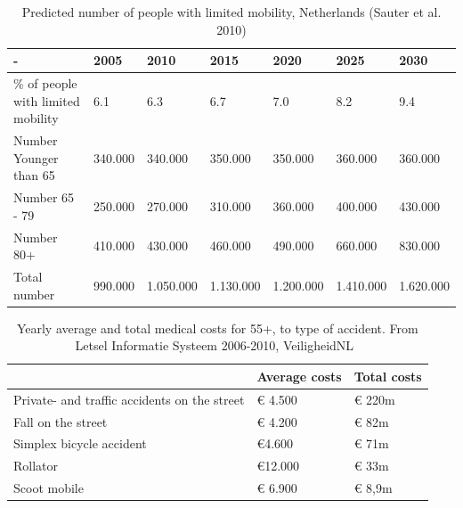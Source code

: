 \begin{table}[h]
	\caption[Predicted number of people with limited mobility]{Predicted number of people with limited mobility, Netherlands (Sauter et al. 2010)}
	\label{nrpeople}
	\centering
	\begin{tabular}{|p{63.6pt}|p{44pt}|p{44pt}|p{44pt}|p{44pt}|p{44pt}|p{44pt}|} 
		\hline 
		-& 2005 & 2010 & 2015 & 2020 & 2025 & 2030 \\
		\hline
		\% of people with limited \newline mobility & 6.1 & 6.3 & 6.7 & 7.0 & 8.2 & 9.4 \\ 
		Number Younger than 65 & 340.000 & 340.000 & 350.000 & 350.000 & 360.000 & 360.000 \\
		Number 65 - 79 & 250.000 & 270.000 & 310.000 & 360.000 & 400.000 & 430.000 \\
		Number 80+ & 410.000 & 430.000 & 460.000 & 490.000 & 660.000 & 830.000 \\
		\hline
		Total number & 990.000 & 1.050.000 & 1.130.000 & 1.200.000 & 1.410.000 & 1.620.000\\
		\hline
	\end{tabular}
\end{table}

\renewcommand{\arraystretch}{1.5}
\renewcommand{\tabcolsep}{0.2cm}
\begin{table}[h]
\caption{Yearly average and total medical costs for 55+, to type of accident. From Letsel Informatie Systeem 2006-2010, VeiligheidNL~\cite{DenHertog2013} \label{costsaccident} }
\centering
\begin{tabular}{|p{236.2pt}|p{70.4pt}|p{70.4pt}|} 
\hline 
& Average costs & Total costs \\
\hline
Private- and traffic accidents on the street & \euro{} 4.500 & \euro{} 220m \\
Fall on the street & \euro{} 4.200 & \euro{} 82m \\
Simplex bicycle accident & \euro{}4.600 & \euro{} 71m \\ 
Rollator & \euro{}12.000 & \euro{} 33m\\ 
Scoot mobile & \euro{} 6.900 & \euro{} 8,9m \\
\hline
\end{tabular}
\end{table}

